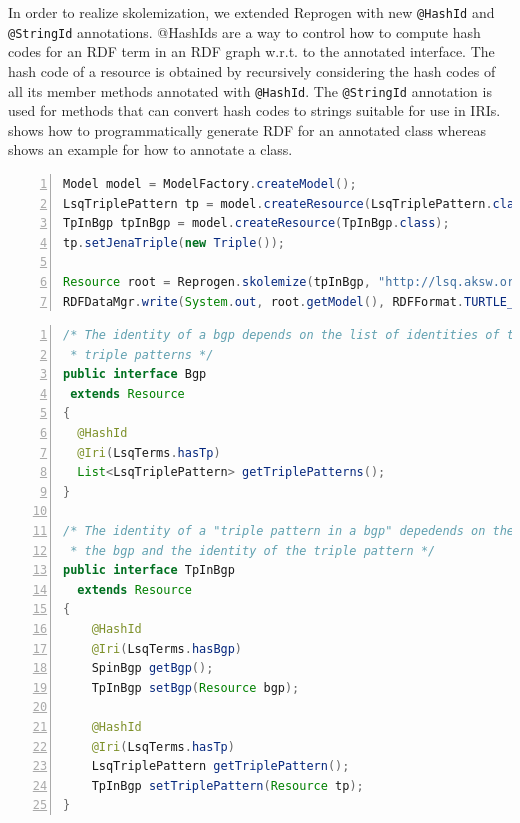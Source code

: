 In order to realize skolemization, we extended Reprogen with new \texttt{@HashId} and \texttt{@StringId} annotations.
@HashIds are a way to control how to compute hash codes for an RDF term in an RDF graph w.r.t. to the annotated interface.
The hash code of a resource is obtained by recursively considering the hash codes of all its member methods annotated with \texttt{@HashId}.
The \texttt{@StringId} annotation is used for methods that can convert hash codes to strings suitable for use in IRIs.
 shows how to programmatically generate RDF for an annotated class whereas
 shows an example for how to annotate a class.


\begin{lstlisting}[label=lst:reprogen-skolem, language=java, caption=Example for setting up and skolemizing a basic LSQ RDF model, style=lst, language=java, numbers=left]
Model model = ModelFactory.createModel();
LsqTriplePattern tp = model.createResource(LsqTriplePattern.class);
TpInBgp tpInBgp = model.createResource(TpInBgp.class);
tp.setJenaTriple(new Triple());

Resource root = Reprogen.skolemize(tpInBgp, "http://lsq.aksw.org");
RDFDataMgr.write(System.out, root.getModel(), RDFFormat.TURTLE_PRETTY);
\end{lstlisting}


\begin{lstlisting}[label=lst:reprogen, language=java, caption=Example of LSQ's annotated Java domain model for which Reprogen generates proxy implementations that can read and write to an RDF graph, style=lst, language=java, float=*, numbers=left]
/* The identity of a bgp depends on the list of identities of the contained
 * triple patterns */
public interface Bgp
 extends Resource
{
  @HashId
  @Iri(LsqTerms.hasTp)
  List<LsqTriplePattern> getTriplePatterns();
}

/* The identity of a "triple pattern in a bgp" depedends on the identity of
 * the bgp and the identity of the triple pattern */
public interface TpInBgp
  extends Resource
{
    @HashId
    @Iri(LsqTerms.hasBgp)
    SpinBgp getBgp();
    TpInBgp setBgp(Resource bgp);

    @HashId
    @Iri(LsqTerms.hasTp)
    LsqTriplePattern getTriplePattern();
    TpInBgp setTriplePattern(Resource tp);
}

\end{lstlisting}


